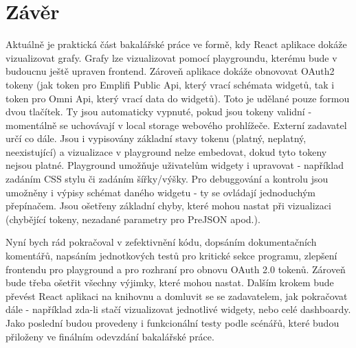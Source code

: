 \documentclass[czech, bc, kiv, he, iso690numb]{fasthesis}
\begin{document}
%
%
%
%
\chapter{Závěr}
Aktuálně je praktická část bakalářské práce ve formě, kdy React aplikace dokáže vizualizovat grafy. Grafy lze vizualizovat pomocí playgroundu, kterému bude v budoucnu ještě upraven
frontend. Zároveň aplikace dokáže obnovovat OAuth2 tokeny (jak token pro Emplifi Public Api, který vrací schémata widgetů, tak i token pro Omni Api, který vrací data do widgetů). Toto je
udělané pouze formou dvou tlačítek. Ty jsou automaticky vypnuté, pokud jsou tokeny validní - momentálně se uchovávají v local storage webového prohlížeče. Externí zadavatel určí co dále. 
Jsou i vypisovány základní stavy tokenu (platný, neplatný, neexistující) a vizualizace v playground nelze embedovat, dokud tyto tokeny nejsou platné. Playground umožňuje uživatelům widgety
i upravovat - například zadáním CSS stylu či zadáním šířky/výšky. Pro debuggování a kontrolu jsou umožněny i výpisy schémat daného widgetu - ty se ovládají jednoduchým přepínačem. Jsou 
ošetřeny základní chyby, které mohou nastat při vizualizaci (chybějící tokeny, nezadané parametry pro PreJSON apod.). 

Nyní bych rád pokračoval v zefektivnění kódu, dopsáním dokumentačních komentářů, napsáním jednotkových testů pro kritické sekce programu, zlepšení frontendu pro playground a pro rozhraní pro
obnovu OAuth 2.0 tokenů. Zároveň bude třeba ošetřit všechny výjimky, které mohou nastat. Dalším krokem bude převést React aplikaci na knihovnu a domluvit se se zadavatelem, jak pokračovat dále -
například zda-li stačí vizualizovat jednotlivé widgety, nebo celé dashboardy. Jako poslední budou provedeny i funkcionální testy podle scénářů, které budou přiloženy ve finálním odevzdání bakalářské práce.

\appendix
\backmatter
\printbibliography
\listoffigures
\listoftables
\listoflistings
%
%
\setbackpageqrcode
\backpage
\end{document}
